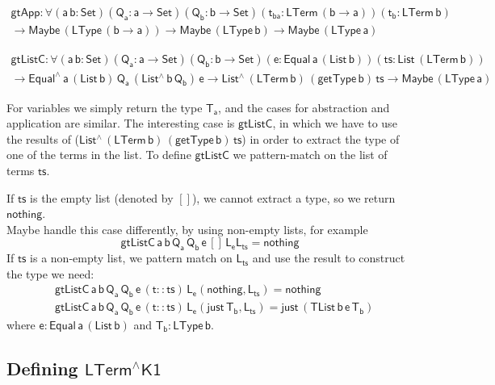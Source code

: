 \documentclass[9pt]{entcs} \usepackage{entcsmacro}
\begin{document}
\begin{multline*}
    \mathsf{gtApp : \forall (a \, b : Set) (Q_a : a \to Set) (Q_b : b \to Set) 
      (t_{ba} : LTerm\, (b \to a)) (t_b : LTerm\, b)} \\ 
    \mathsf{
      \to Maybe\, (LType\, (b \to a))
      \to Maybe\, (LType\, b)
      \to Maybe\, (LType\, a)
    }
\end{multline*}


\begin{multline*}
    \mathsf{gtListC : \forall (a \, b : Set) (Q_a : a \to Set) (Q_b : b \to Set) 
      (e : Equal\, a\, (List\, b)) (ts : List\, (LTerm\, b))} \\ 
    \mathsf{
      \to Equal^{\wedge}\, a\, (List\,b) \, Q_a\, (List^{\wedge}\, b\, Q_b)\, e
      \to List^{\wedge}\, (LTerm\, b)\, (getType\, b)\, ts
      \to Maybe\, (LType\, a)
    }
\end{multline*}


For variables we simply return the type $\mathsf{T_a}$, 
and the cases for abstraction and application are similar.
The interesting case is $\mathsf{gtListC}$, in which we have to use 
the results of ($\mathsf{List^{\wedge}\, (LTerm\, b)\, (getType\, b)\, ts}$)
in order to extract the type of one of the terms in the list. 
To define $\mathsf{gtListC}$ we pattern-match on the list of terms $\mathsf{ts}$.  

If $\mathsf{ts}$ is the empty list (denoted by $\mathsf{[]}$), we cannot extract a type, 
so we return $\mathsf{nothing}$. \\
{\color{red} Maybe handle this case differently, by using non-empty lists, for example}
\[
  \mathsf{gtListC\, a\, b\, Q_a\, Q_b\, e\, [] \, L_e L_{ts} = nothing}
\]
If $\mathsf{ts}$ is a non-empty list, we pattern match on $\mathsf{L_{ts}}$ and use the result
to construct the type we need:
\begin{align*}
  &\mathsf{gtListC\, a\, b\, Q_a\, Q_b\, e\, (t :: ts) \, L_e (nothing , L_{ts}) = nothing} \\
  &\mathsf{gtListC\, a\, b\, Q_a\, Q_b\, e\, (t :: ts) \, L_e (just\, T_b , L_{ts}) = just \, (TList\, b\, e\, T_b)}
\end{align*}
where $\mathsf{e : Equal\, a\, (List\,b)}$ and $\mathsf{T_b : LType\, b}$. 

\subsection{Defining $\mathsf{LTerm^{\wedge}K1}$}
\end{document}
